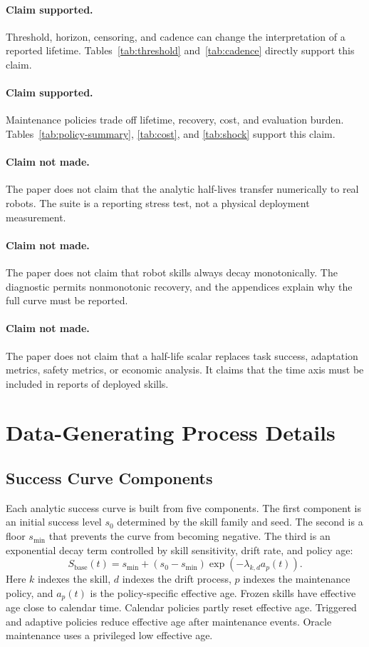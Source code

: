 \documentclass{article}
\begin{document}
\paragraph{Claim supported.}
Threshold, horizon, censoring, and cadence can change the interpretation of a
reported lifetime. Tables~\ref{tab:threshold} and~\ref{tab:cadence} directly
support this claim.

\paragraph{Claim supported.}
Maintenance policies trade off lifetime, recovery, cost, and evaluation burden.
Tables~\ref{tab:policy-summary}, \ref{tab:cost}, and \ref{tab:shock} support
this claim.

\paragraph{Claim not made.}
The paper does not claim that the analytic half-lives transfer numerically to
real robots. The suite is a reporting stress test, not a physical deployment
measurement.

\paragraph{Claim not made.}
The paper does not claim that robot skills always decay monotonically. The
diagnostic permits nonmonotonic recovery, and the appendices explain why the
full curve must be reported.

\paragraph{Claim not made.}
The paper does not claim that a half-life scalar replaces task success,
adaptation metrics, safety metrics, or economic analysis. It claims that the
time axis must be included in reports of deployed skills.

\section{Data-Generating Process Details}

\subsection{Success Curve Components}

Each analytic success curve is built from five components. The first component
is an initial success level $s_0$ determined by the skill family and seed. The
second is a floor $s_{\min}$ that prevents the curve from becoming negative.
The third is an exponential decay term controlled by skill sensitivity, drift
rate, and policy age:
\[
S_{\text{base}}(t)=s_{\min} + (s_0-s_{\min})\exp(-\lambda_{k,d} a_p(t)).
\]
Here $k$ indexes the skill, $d$ indexes the drift process, $p$ indexes the
maintenance policy, and $a_p(t)$ is the policy-specific effective age. Frozen
skills have effective age close to calendar time. Calendar policies partly
reset effective age. Triggered and adaptive policies reduce effective age after
maintenance events. Oracle maintenance uses a privileged low effective age.
\end{document}
